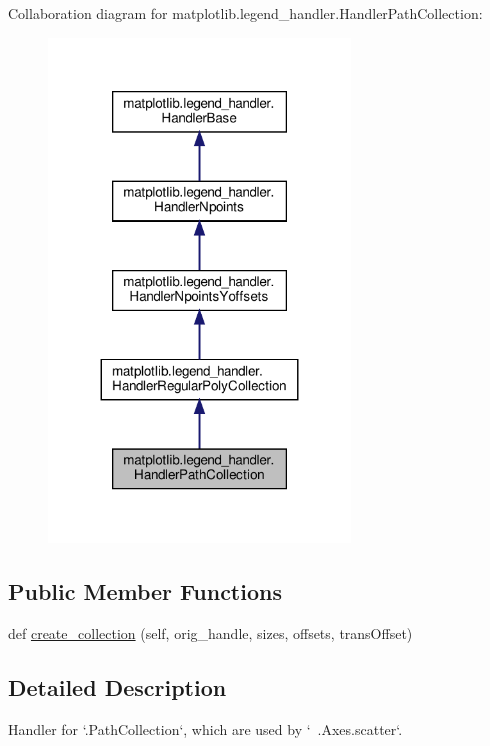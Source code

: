 Collaboration diagram for matplotlib.\+legend\+\_\+handler.\+Handler\+Path\+Collection\+:
\nopagebreak
\begin{figure}[H]
\begin{center}
\leavevmode
\includegraphics[width=227pt]{classmatplotlib_1_1legend__handler_1_1HandlerPathCollection__coll__graph}
\end{center}
\end{figure}
\subsection*{Public Member Functions}
\begin{DoxyCompactItemize}
\item 
def \hyperlink{classmatplotlib_1_1legend__handler_1_1HandlerPathCollection_a5812b8b06d751a5b3ef77e98d9eda12f}{create\+\_\+collection} (self, orig\+\_\+handle, sizes, offsets, trans\+Offset)
\end{DoxyCompactItemize}


\subsection{Detailed Description}
\begin{DoxyVerb}Handler for `.PathCollection`\s, which are used by `~.Axes.scatter`.\end{DoxyVerb}
 

